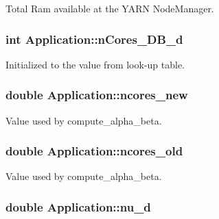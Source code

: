 Total Ram available at the Y\-A\-R\-N Node\-Manager. 

\hypertarget{classApplication_a95104d330c9c7ed2c1017b4938a39a9a}{
\subsubsection[{n\-Cores\-\_\-\-D\-B\-\_\-d}]{\setlength{\rightskip}{0pt plus 5cm}int Application\-::n\-Cores\-\_\-\-D\-B\-\_\-d\hspace{0.3cm}{\ttfamily [private]}}}\label{classApplication_a95104d330c9c7ed2c1017b4938a39a9a}


Initialized to the value from look-\/up table. 

\hypertarget{classApplication_a12d69161b8f2767e6ea1d19d3e6457e2}{
\subsubsection[{ncores\-\_\-new}]{\setlength{\rightskip}{0pt plus 5cm}double Application\-::ncores\-\_\-new\hspace{0.3cm}{\ttfamily [private]}}}\label{classApplication_a12d69161b8f2767e6ea1d19d3e6457e2}


Value used by compute\-\_\-alpha\-\_\-beta. 

\hypertarget{classApplication_a704e411528bc630525070e8b3e990145}{
\subsubsection[{ncores\-\_\-old}]{\setlength{\rightskip}{0pt plus 5cm}double Application\-::ncores\-\_\-old\hspace{0.3cm}{\ttfamily [private]}}}\label{classApplication_a704e411528bc630525070e8b3e990145}


Value used by compute\-\_\-alpha\-\_\-beta. 

\hypertarget{classApplication_a42c22b9a3130cf1f2722ce222f2e5bae}{
\subsubsection[{nu\-\_\-d}]{\setlength{\rightskip}{0pt plus 5cm}double Application\-::nu\-\_\-d\hspace{0.3cm}{\ttfamily [private]}}}\label{classApplication_a42c22b9a3130cf1f2722ce222f2e5bae}


